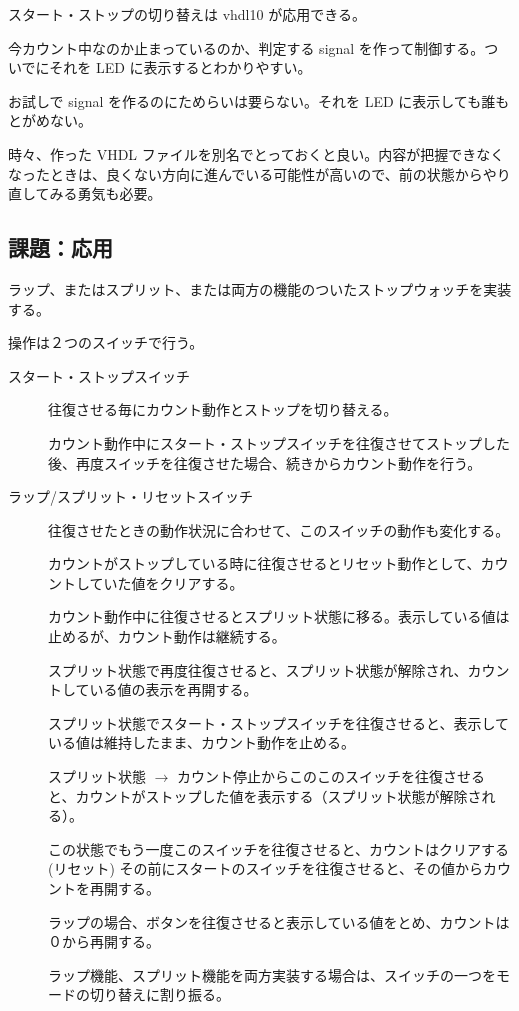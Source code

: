 \documentclass[letterpaper,10pt,dvipdfmx]{sphinxmanual}
\begin{document}
スタート・ストップの切り替えは vhdl10 が応用できる。

今カウント中なのか止まっているのか、判定する signal を作って制御する。ついでにそれを LED に表示するとわかりやすい。

お試しで signal を作るのにためらいは要らない。それを LED に表示しても誰もとがめない。

時々、作った VHDL ファイルを別名でとっておくと良い。内容が把握できなくなったときは、良くない方向に進んでいる可能性が高いので、前の状態からやり直してみる勇気も必要。


\subsection{課題：応用}
\label{\detokenize{05_try:id33}}
ラップ、またはスプリット、または両方の機能のついたストップウォッチを実装する。

操作は２つのスイッチで行う。
\begin{description}
\item[{スタート・ストップスイッチ}] \leavevmode
往復させる毎にカウント動作とストップを切り替える。

カウント動作中にスタート・ストップスイッチを往復させてストップした後、再度スイッチを往復させた場合、続きからカウント動作を行う。

\item[{ラップ/スプリット・リセットスイッチ}] \leavevmode
往復させたときの動作状況に合わせて、このスイッチの動作も変化する。

カウントがストップしている時に往復させるとリセット動作として、カウントしていた値をクリアする。

カウント動作中に往復させるとスプリット状態に移る。表示している値は止めるが、カウント動作は継続する。

スプリット状態で再度往復させると、スプリット状態が解除され、カウントしている値の表示を再開する。

スプリット状態でスタート・ストップスイッチを往復させると、表示している値は維持したまま、カウント動作を止める。

スプリット状態 \(\rightarrow\) カウント停止からこのこのスイッチを往復させると、カウントがストップした値を表示する（スプリット状態が解除される）。

この状態でもう一度このスイッチを往復させると、カウントはクリアする (リセット) その前にスタートのスイッチを往復させると、その値からカウントを再開する。

ラップの場合、ボタンを往復させると表示している値をとめ、カウントは０から再開する。

ラップ機能、スプリット機能を両方実装する場合は、スイッチの一つをモードの切り替えに割り振る。

\end{description}
\end{document}
